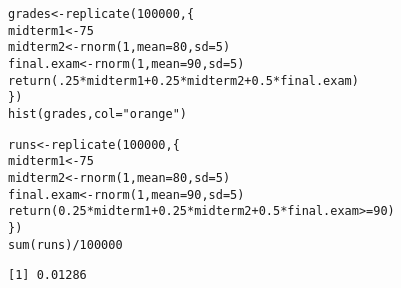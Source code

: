 \documentclass{beamer}\usepackage[]{graphicx}\usepackage[]{color}
\makeatletter
\newcommand{\hlnum}[1]{\textcolor[rgb]{0.824,0.412,0.118}{#1}}%
\newcommand{\hlstr}[1]{\textcolor[rgb]{1,0.894,0.71}{#1}}%
\newcommand{\hlopt}[1]{\textcolor[rgb]{1,0.894,0.769}{#1}}%
\newcommand{\hlstd}[1]{\textcolor[rgb]{1,0.894,0.769}{#1}}%
\newcommand{\hlkwb}[1]{\textcolor[rgb]{0.804,0.776,0.451}{#1}}%
\newcommand{\hlkwc}[1]{\textcolor[rgb]{0.78,0.941,0.545}{#1}}%
\newcommand{\hlkwd}[1]{\textcolor[rgb]{1,0.78,0.769}{#1}}%
\newenvironment{kframe}{%
 \def\at@end@of@kframe{}%
 \ifinner\ifhmode%
  \def\at@end@of@kframe{\end{minipage}}%
  \begin{minipage}{\columnwidth}%
 \fi\fi%
 \def\FrameCommand##1{\hskip\@totalleftmargin \hskip-\fboxsep
 \colorbox{shadecolor}{##1}\hskip-\fboxsep
     \hskip-\linewidth \hskip-\@totalleftmargin \hskip\columnwidth}%
 \MakeFramed {\advance\hsize-\width
   \@totalleftmargin\z@ \linewidth\hsize
   \@setminipage}}%
 {\par\unskip\endMakeFramed%
 \at@end@of@kframe}
\newenvironment{knitrout}{}{} %
\makeatother
\begin{document}
\begin{darkframes}
    \begin{frame}[fragile]
      \fontsm
\begin{knitrout}
\begin{kframe}
\begin{alltt}
\hlstd{grades} \hlkwb{<-} \hlkwd{replicate}\hlstd{(}\hlnum{100000}\hlstd{, \{}
  \hlstd{midterm1} \hlkwb{<-} \hlnum{75}
  \hlstd{midterm2} \hlkwb{<-} \hlkwd{rnorm}\hlstd{(}\hlnum{1}\hlstd{,} \hlkwc{mean}\hlstd{=}\hlnum{80}\hlstd{,} \hlkwc{sd}\hlstd{=}\hlnum{5}\hlstd{)}
  \hlstd{final.exam} \hlkwb{<-} \hlkwd{rnorm}\hlstd{(}\hlnum{1}\hlstd{,} \hlkwc{mean}\hlstd{=}\hlnum{90}\hlstd{,} \hlkwc{sd}\hlstd{=}\hlnum{5}\hlstd{)}
  \hlkwd{return}\hlstd{(}\hlnum{.25}\hlopt{*}\hlstd{midterm1} \hlopt{+} \hlnum{0.25}\hlopt{*}\hlstd{midterm2} \hlopt{+} \hlnum{0.5}\hlopt{*}\hlstd{final.exam)}
\hlstd{\})}
\hlkwd{hist}\hlstd{(grades,} \hlkwc{col}\hlstd{=}\hlstr{"orange"}\hlstd{)}
\end{alltt}
\end{kframe}


\end{knitrout}
    \end{frame}

    \begin{frame}[fragile]
      \fontsm
\begin{knitrout}
\begin{kframe}
\begin{alltt}
\hlstd{runs} \hlkwb{<-} \hlkwd{replicate}\hlstd{(}\hlnum{100000}\hlstd{, \{}
  \hlstd{midterm1} \hlkwb{<-} \hlnum{75}
  \hlstd{midterm2} \hlkwb{<-} \hlkwd{rnorm}\hlstd{(}\hlnum{1}\hlstd{,} \hlkwc{mean}\hlstd{=}\hlnum{80}\hlstd{,} \hlkwc{sd}\hlstd{=}\hlnum{5}\hlstd{)}
  \hlstd{final.exam} \hlkwb{<-} \hlkwd{rnorm}\hlstd{(}\hlnum{1}\hlstd{,} \hlkwc{mean}\hlstd{=}\hlnum{90}\hlstd{,} \hlkwc{sd}\hlstd{=}\hlnum{5}\hlstd{)}
  \hlkwd{return}\hlstd{(}\hlnum{0.25}\hlopt{*}\hlstd{midterm1} \hlopt{+} \hlnum{0.25}\hlopt{*}\hlstd{midterm2} \hlopt{+} \hlnum{0.5}\hlopt{*}\hlstd{final.exam} \hlopt{>=} \hlnum{90}\hlstd{)}
\hlstd{\})}
\hlkwd{sum}\hlstd{(runs)} \hlopt{/} \hlnum{100000}
\end{alltt}
\begin{verbatim}
[1] 0.01286
\end{verbatim}
\end{kframe}
\end{knitrout}


\end{frame}
\end{darkframes}
\end{document}
